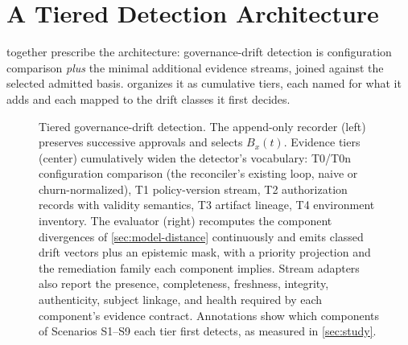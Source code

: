 \section{A Tiered Detection Architecture}
\label{sec:architecture}

 together prescribe the architecture:
governance-drift detection is configuration comparison \emph{plus} the
minimal additional evidence streams, joined against the selected admitted basis.
 organizes it as cumulative tiers, each named for what
it adds and each mapped to the drift classes it first decides.

\begin{figure}[t]
\centering
\resizebox{0.93\textwidth}{!}{}
\caption{Tiered governance-drift detection. The append-only recorder (left)
preserves successive approvals and selects $B_x(t)$. Evidence tiers (center) cumulatively widen
the detector's vocabulary: T0/T0n configuration comparison (the reconciler's
existing loop, naive or churn-normalized), T1 policy-version stream, T2
authorization records with validity semantics, T3 artifact lineage, T4
environment inventory. The evaluator (right) recomputes the component
divergences of \cref{sec:model-distance} continuously and emits classed drift
vectors plus an epistemic mask, with a priority projection and the remediation
family each component implies. Stream adapters also report the presence,
completeness, freshness, integrity, authenticity, subject linkage, and health
required by each component's evidence contract. Annotations show which components of
Scenarios S1--S9 each tier first detects, as measured in
\cref{sec:study}.}
\label{fig:architecture}
\end{figure}

